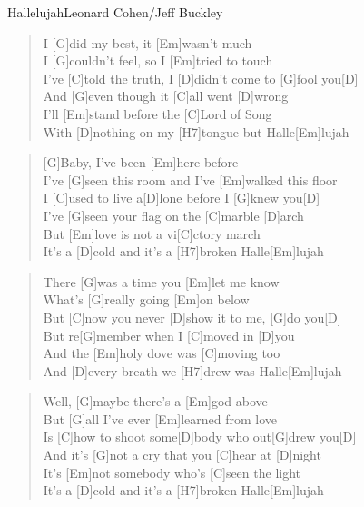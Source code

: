 \begin{song}{Hallelujah}{Leonard Cohen/Jeff Buckley}

    \begin{verse}  
        I [G]did my best, it [Em]wasn't much \\
        I [G]couldn't feel, so I [Em]tried to touch \\
        I've [C]told the truth, I [D]didn't come to [G]fool you[D] \\
        And [G]even though it [C]all went [D]wrong \\
        I'll [Em]stand before the [C]Lord of Song \\
        With [D]nothing on my [H7]tongue but Halle[Em]lujah
    \end{verse}  


    \begin{verse}  
        [G]Baby, I've been [Em]here before \\
        I've [G]seen this room and I've [Em]walked this floor \\
        I [C]used to live a[D]lone before I [G]knew you[D] \\
        I've [G]seen your flag on the [C]marble [D]arch \\
        But [Em]love is not a vi[C]ctory march \\
        It's a [D]cold and it's a [H7]broken Halle[Em]lujah
    \end{verse}  


    \begin{verse}  
        There [G]was a time you [Em]let me know \\
        What's [G]really going [Em]on below \\
        But [C]now you never [D]show it to me, [G]do you[D] \\
        But re[G]member when I [C]moved in [D]you \\
        And the [Em]holy dove was [C]moving too \\
        And [D]every breath we [H7]drew was Halle[Em]lujah
    \end{verse}  


    \begin{verse}  
        Well, [G]maybe there's a [Em]god above \\
        But [G]all I've ever [Em]learned from love \\
        Is [C]how to shoot some[D]body who out[G]drew you[D] \\
        And it's [G]not a cry that you [C]hear at [D]night \\
        It's [Em]not somebody who's [C]seen the light \\
        It's a [D]cold and it's a [H7]broken Halle[Em]lujah
    \end{verse}  


\end{song}
